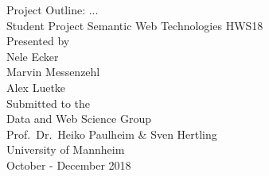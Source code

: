\documentclass[11pt,titlepage,oneside,openany]{article}
\begin{document}
\begin{titlepage}
	\vspace*{2cm}
  \begin{center}
   {\huge Project Outline: ... \\}
   \vspace{2cm} 
   {\Large Student Project Semantic Web Technologies HWS18\\}
   \vspace{2cm}
   {\Large Presented by \\}
   \vspace{0.5cm}
    {
    Nele Ecker\\
    Marvin Messenzehl \\
    Alex Luetke\\
   }
   \vspace{1cm} 
   { Submitted to the\\
    Data and Web Science Group\\
    Prof.\ Dr.\ Heiko Paulheim \& Sven Hertling \\
    University of Mannheim\\} \vspace{2cm}
   {October - December 2018}
  \end{center}
\end{titlepage} 

\tableofcontents
\newpage












\newpage


\pagestyle{empty}



\end{document}
